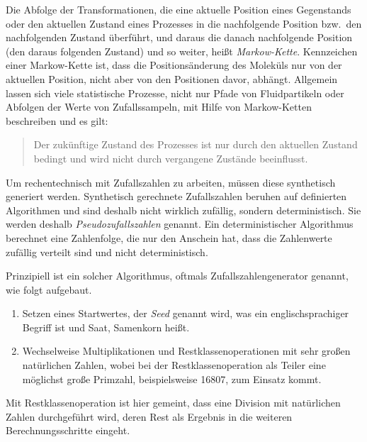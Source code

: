 Die Abfolge der Transformationen, die eine aktuelle Position eines Gegenstands oder den
aktuellen Zustand eines Prozesses in die nachfolgende Position bzw.\ den nachfolgenden
Zustand überführt, und daraus die danach nachfolgende Position (den daraus folgenden Zustand)
und so weiter, heißt \textsl{Markow-Kette}. Kennzeichen einer Markow-Kette ist, dass die
Positions\-änder\-ung des Moleküls nur von der aktuellen Position,
nicht aber von den Positionen davor, abhängt. Allgemein lassen sich viele statistische Prozesse,
nicht nur Pfade von Fluidpartikeln oder Abfolgen der Werte von Zufallssampeln, mit Hilfe von
Markow-Ketten beschreiben und es gilt:
\begin{quote}
Der zukünftige Zustand des Prozesses ist nur durch den
aktuellen Zustand bedingt und wird nicht durch vergangene Zustände beeinflusst.
\end{quote}

Um rechentechnisch mit Zufallszahlen zu arbeiten, müssen diese synthetisch generiert werden.
Synthetisch gerechnete Zufallszahlen beruhen auf definierten Algorithmen und
sind deshalb nicht wirklich zufällig, sondern deterministisch. Sie werden deshalb
\textsl{Pseudozufallszahlen} genannt.
Ein deterministischer Algorithmus berechnet eine Zahlenfolge, die nur den
Anschein hat, dass die Zahlenwerte zufällig verteilt sind und nicht deterministisch.

Prinzipiell ist ein solcher Algorithmus, oftmals Zufallszahlengenerator genannt, wie
folgt aufgebaut.
\begin{enumerate}
\item Setzen eines Startwertes, der \textsl{Seed} genannt wird, was ein englischsprachiger
  Begriff ist und Saat, Samenkorn heißt.
\item Wechselweise Multiplikationen und Restklassenoperationen mit sehr großen natürlichen Zahlen, wobei
  bei der Restklassenoperation als Teiler eine möglichst große Primzahl, beispielsweise
  16807, zum Einsatz kommt.
\end{enumerate}
Mit Restklassenoperation ist hier gemeint, dass eine Division mit natürlichen Zahlen
durchgeführt wird, deren Rest als Ergebnis in die weiteren Berechnungsschritte eingeht.


